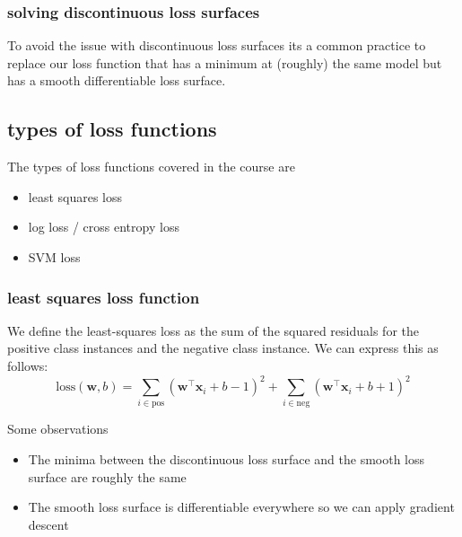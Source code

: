\documentclass[12pt]{article}
\begin{document}
\subsubsection*{solving discontinuous loss surfaces}

To avoid the issue with discontinuous loss surfaces its a common practice to replace our loss function that has a minimum at (roughly) the same model but has a smooth differentiable loss surface.

\subsection{types of loss functions}

The types of loss functions covered in the course are 
\begin{itemize}[leftmargin=*, noitemsep]
    \item least squares loss
    \item log loss / cross entropy loss
    \item SVM loss
\end{itemize}

\subsubsection*{least squares loss function}


We define the least-squares loss as the sum of the squared residuals for the positive class instances and the negative class instance. We can express this as follows: 
\begin{equation}
    \text{loss}(\mathbf{w}, b) = \sum_{i \in \text{pos}} {(\mathbf{w}^\intercal\mathbf{x}_i+b-1)}^2 + \sum_{i \in \text{neg}} {(\mathbf{w}^\intercal\mathbf{x}_i+b+1)}^2
\end{equation}

Some observations 
\begin{itemize}[leftmargin=*, noitemsep]
    \item The minima between the discontinuous loss surface and the smooth loss surface are roughly the same
    \item The smooth loss surface is differentiable everywhere so we can apply gradient descent
\end{itemize}
\end{document}

